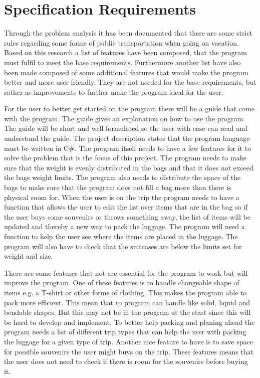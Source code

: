 \section{Specification Requirements}
\label{sec:Spec}
Through the problem analysis it has been documented that there are some strict rules regarding some forms of public transportation when going on vacation. Based on this research a list of features have been composed, that the program must fulfil to meet the base requirements.
Furthermore another list have also been made composed of some additional features that would make the program better and more user friendly. They are not needed for the base requirements, but rather as improvements to further make the program ideal for the user.

For the user to better get started on the program there will be a guide that come with the program. The guide gives an explanation on how to use the program. The guide will be short and well formulated so the user with ease can read and understand the guide.
The project description states that the program language must be written in C#.
The program itself needs to have a few features for it to solve the problem that is the focus of this project. The program needs to make sure that the weight is evenly distributed in the bags and that it does not exceed the bags weight limits. The program also needs to distribute the space of the bags to make sure that the program does not fill a bag more than there is physical room for.
When the user is on the trip the program needs to have a function that allows the user to edit the list over items that are in the bag so if the user buys some souvenirs or throws something away, the list of items will be updated and thereby a new way to pack the luggage.
The program will need a function to help the user see where the items are placed in the luggage.
The program will also have to check that the suitcases are below the limits set for weight and size.


There are some features that not are essential for the program to work but will improve the program. One of these features is to handle changeable shape of items e.g. a T-shirt or other forms of clothing. This makes the program able to pack more efficient. This mean that to program can handle like solid, liquid and bendable shapes. But this may not be in the program at the start since this will be hard to develop and implement.
To better help packing and planing ahead the program needs a list of different trip types that can help the user with packing the luggage for a given type of trip.
Another nice feature to have is to save space for possible souvenirs the user might buys on the trip. These features means that the user does not need to check if there is room for the souvenirs before buying it.

